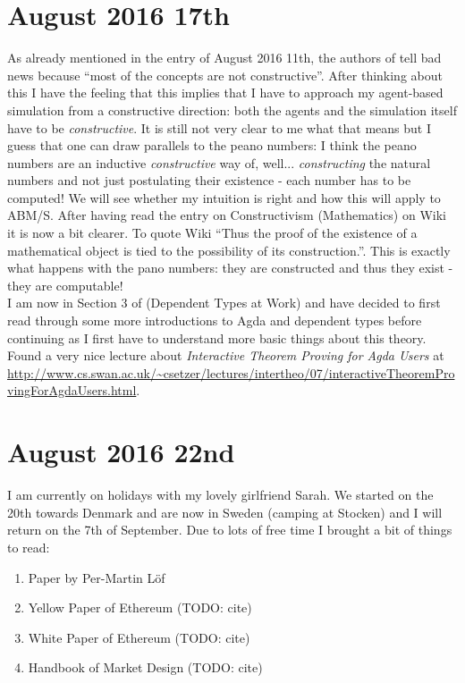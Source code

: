 \section*{August 2016 17th}
As already mentioned in the entry of August 2016 11th, the authors of \cite{Ionescu2013} tell bad news because \enquote{most of the concepts are not constructive}. After thinking about this I have the feeling that this implies that I have to approach my agent-based simulation from a constructive direction: both the agents and the simulation itself have to be \textit{constructive}. It is still not very clear to me what that means but I guess that one can draw parallels to the peano numbers: I think the peano numbers are an inductive \textit{constructive} way of, well... \textit{constructing} the natural numbers and not just postulating their existence - each number has to be computed! We will see whether my intuition is right and how this will apply to ABM/S. 
\bigskip
After having read the entry on Constructivism (Mathematics) on Wiki it is now a bit clearer. To quote Wiki \enquote{Thus the proof of the existence of a mathematical object is tied to the possibility of its construction.}. This is exactly what happens with the pano numbers: they are constructed and thus they exist - they are computable! \\
\bigskip
I am now in Section 3 of \cite{Bove2009} (Dependent Types at Work) and have decided to first read through some more introductions to Agda and dependent types before continuing as I first have to understand more basic things about this theory. \\
\bigskip
Found a very nice lecture about \textit{Interactive Theorem Proving for Agda Users} at \url{http://www.cs.swan.ac.uk/~csetzer/lectures/intertheo/07/interactiveTheoremProvingForAgdaUsers.html}. 


\section*{August 2016 22nd}
I am currently on holidays with my lovely girlfriend Sarah. We started on the 20th towards Denmark and are now in Sweden (camping at Stocken) and I will return on the 7th of September. Due to lots of free time I brought a bit of things to read:

\begin{enumerate}
\item Paper by Per-Martin Löf
\item Yellow Paper of Ethereum (TODO: cite)
\item White Paper of Ethereum (TODO: cite)
\item Handbook of Market Design (TODO: cite)
\end{enumerate}

